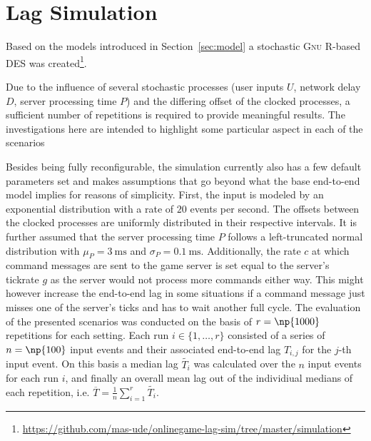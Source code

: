 \section{Lag Simulation}
\label{sec:simulation}

Based on the models introduced in Section~\ref{sec:model} a stochastic \textsc{Gnu R}-based \gls{DES} was created\footnote{\url{https://github.com/mas-ude/onlinegame-lag-sim/tree/master/simulation}}.

Due to the influence of several stochastic processes (user inputs $U$, network delay $D$, server processing time $P$) and the differing offset of the clocked processes, a sufficient number of repetitions is required to provide meaningful results. The investigations here are intended to highlight some particular aspect in each of the scenarios

Besides being fully reconfigurable, the simulation currently also has a few default parameters set and makes assumptions that go beyond what the base end-to-end model implies for reasons of simplicity.
First, the input is modeled by an exponential distribution with a rate of $20$ events per second. The offsets between the clocked processes are uniformly distributed in their respective intervals. It is further assumed that the server processing time $P$ follows a left-truncated normal distribution with $\mu_P = \SI{3}{\milli\second}$ and $\sigma_P = \SI{0.1}{\milli\second}$. Additionally, the rate $c$ at which command messages are sent to the game server is set equal to the server's tickrate $g$ as the server would not process more commands either way. This might however increase the end-to-end lag in some situations if a command message just misses one of the server's ticks and has to wait another full cycle. The evaluation of the presented scenarios was conducted on the basis of $r=\np{1000}$ repetitions for each setting. Each run $i \in \{1,\dots,r\}$ consisted of a series of $n=\np{100}$ input events and their associated end-to-end lag $T_{i,j}$ for the $j$-th input event. On this basis a median lag $\widetilde{T_i}$ was calculated over the $n$ input events for each run $i$, and finally an overall mean lag out of the individiual medians of each repetition, i.e. $\overline{T}=\frac{1}{n}\sum_{i=1}^r\widetilde{T_i}$.


